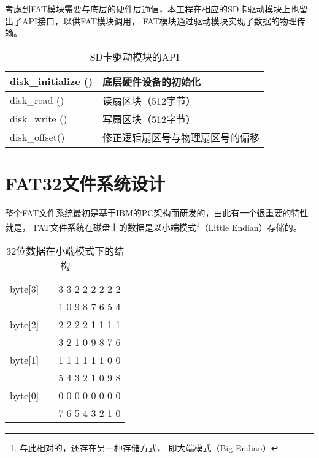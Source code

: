 考虑到FAT模块需要与底层的硬件层通信，本工程在相应的SD卡驱动模块上也留出了API接口，以供FAT模块调用，
FAT模块通过驱动模块实现了数据的物理传输。
\begin{longtable}[!htb]{ll}
\caption{SD卡驱动模块的API} \label{tab:sdapi}\\
    \toprule
    disk\_initialize () & 底层硬件设备的初始化\\ \midrule
    disk\_read () & 读扇区块（512字节）\\ \midrule
    disk\_write () & 写扇区块（512字节）\\ \midrule
    disk\_offset() & 修正逻辑扇区号与物理扇区号的偏移\\
    \bottomrule
\end{longtable}

\section{FAT32文件系统设计}
\label{sec:FAT32}
整个FAT文件系统最初是基于IBM的PC架构而研发的，由此有一个很重要的特性就是，
FAT文件系统在磁盘上的数据是以小端模式\footnote{与此相对的，还存在另一种存储方式，
即大端模式（Big Endian）}（Little Endian）存储的。
\begin{table}[!htb]
  \centering
  \caption[小端模式存储示例]{32位数据在小端模式下的结构}\label{tab:littleendian}
  \begin{tabular}{lcr} \toprule
      byte[3] & &3 3 2 2 2 2 2 2 \\
              & &1 0 9 8 7 6 5 4 \\
      byte[2] & &2 2 2 2 1 1 1 1 \\
              & &3 2 1 0 9 8 7 6 \\
      byte[1] & &1 1 1 1 1 1 0 0 \\
              & &5 4 3 2 1 0 9 8 \\
      byte[0] & &0 0 0 0 0 0 0 0 \\
              & &7 6 5 4 3 2 1 0 \\ \bottomrule
  \end{tabular}
\end{table}

